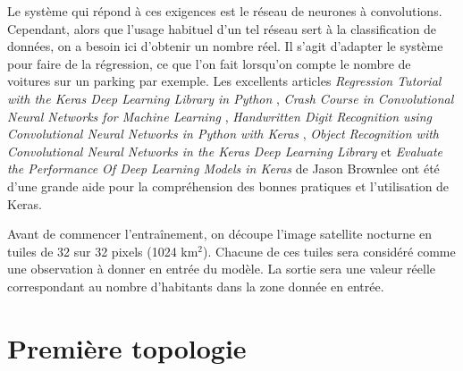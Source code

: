 \documentclass[a4paper, 11pt]{report}
\begin{document}
Le système qui répond à ces exigences est le réseau de neurones à convolutions. Cependant, alors que l'usage habituel d'un tel réseau sert à la classification de données, on a besoin ici d'obtenir un nombre réel. Il s'agit d'adapter le système pour faire de la régression, ce que l'on fait lorsqu'on compte le nombre de voitures sur un parking par exemple. Les excellents articles \textit{Regression Tutorial with the Keras Deep Learning Library in Python} \cite{blog-reg}, \textit{Crash Course in Convolutional Neural Networks for Machine Learning} \cite{blog-cra}, \textit{Handwritten Digit Recognition using Convolutional Neural Networks in Python with Keras} \cite{blog-han}, \textit{Object Recognition with Convolutional Neural Networks in the Keras Deep Learning Library} \cite{blog-obj} et \textit{Evaluate the Performance Of Deep Learning Models in Keras} \cite{blog-eva} de Jason Brownlee ont été d'une grande aide pour la compréhension des bonnes pratiques et l'utilisation de Keras.

Avant de commencer l'entraînement, on découpe l'image satellite nocturne en tuiles de 32 sur 32 pixels (1024 km$^2$). Chacune de ces tuiles sera considéré comme une observation à donner en entrée du modèle. La sortie sera une valeur réelle correspondant au nombre d'habitants dans la zone donnée en entrée.

\section{Première topologie}
\end{document}
